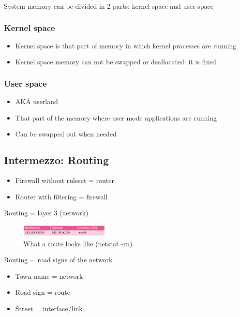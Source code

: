\documentclass{article}
\begin{document}
System memory can be divided in 2 parts: kernel space and user space

\subsubsection{Kernel space}

\begin{itemize}
    \item Kernel space is that part of memory in which kernel processes are running
    \item Kernel space memory can not be swapped or deallocated: it is fixed
\end{itemize}

\subsubsection{User space}

\begin{itemize}
    \item AKA userland
    \item That part of the memory where user mode applications are running
    \item Can be swapped out when needed
\end{itemize}

\subsection{Intermezzo: Routing}

\begin{itemize}
    \item Firewall without ruleset = router
    \item Router with filtering = firewall
\end{itemize}

Routing = layer 3 (network)

\begin{figure}[H]
    \centering
    \includegraphics[width=0.4\textwidth]{routing-table.png}
    \caption{What a route looks like (netstat -rn)}
\end{figure}

Routing = road signs of the network

\begin{itemize}
    \item Town name = network
    \item Road sign = route
    \item Street = interface/link
\end{itemize}
\end{document}

